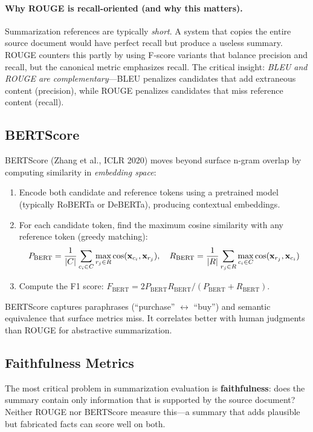 \paragraph{Why ROUGE is recall-oriented (and why this matters).}
Summarization references are typically \emph{short}.  A system that copies the
entire source document would have perfect recall but produce a useless summary.
ROUGE counters this partly by using F-score variants that balance precision and
recall, but the canonical metric emphasizes recall.  The critical insight:
\emph{BLEU and ROUGE are complementary}---BLEU penalizes candidates that add
extraneous content (precision), while ROUGE penalizes candidates that miss
reference content (recall).

\subsection{BERTScore}

BERTScore (Zhang et al., ICLR 2020) moves beyond surface n-gram overlap by
computing similarity in \emph{embedding space}:

\begin{enumerate}
    \item Encode both candidate and reference tokens using a pretrained model
          (typically RoBERTa or DeBERTa), producing contextual embeddings.
    \item For each candidate token, find the maximum cosine similarity with any
          reference token (greedy matching):
          \[
              P_{\text{BERT}} = \frac{1}{|C|}\sum_{c_i \in C}\max_{r_j \in R}\cos(\mathbf{x}_{c_i}, \mathbf{x}_{r_j}), \quad
              R_{\text{BERT}} = \frac{1}{|R|}\sum_{r_j \in R}\max_{c_i \in C}\cos(\mathbf{x}_{r_j}, \mathbf{x}_{c_i})
          \]
    \item Compute the F1 score: $F_{\text{BERT}} = 2 P_{\text{BERT}} R_{\text{BERT}} / (P_{\text{BERT}} + R_{\text{BERT}})$.
\end{enumerate}

BERTScore captures paraphrases (``purchase'' $\leftrightarrow$ ``buy'') and
semantic equivalence that surface metrics miss.  It correlates better with human
judgments than ROUGE for abstractive summarization.

\subsection{Faithfulness Metrics}
\label{sec:faithfulness}

The most critical problem in summarization evaluation is \textbf{faithfulness}:
does the summary contain only information that is supported by the source
document?  Neither ROUGE nor BERTScore measure this---a summary that adds
plausible but fabricated facts can score well on both.

